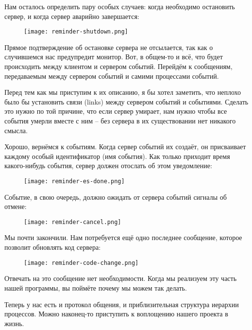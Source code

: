 Нам осталось определить пару особых случаев: когда необходимо остановить сервер, и когда сервер аварийно завершается:
\begin{figure}[h!]
    \centering
    \texttt{[image: reminder-shutdown.png]}
\end{figure}

Прямое подтверждение об остановке  сервера не отсылается, так как о случившемся нас предупредит монитор.
Вот, в общем\--то и всё, что будет происходить между клиентом и сервером событий.
Перейдём к сообщениям, передаваемым между сервером событий и самими процессами событий.

Перед тем как мы приступим к их описанию, я бы хотел заметить, что неплохо было бы установить связи (links)  между сервером событий и событиями.
Сделать это нужно по той причине, что если сервер умирает, нам нужно чтобы все события умерли вместе с ним \--- без сервера в их существовании нет никакого смысла.

Хорошо, вернёмся к событиям.
Когда сервер событий их создаёт, он присваивает каждому особый идентификатор (имя события).
Как только приходит время какого\--нибудь события, сервер должен отослать об этом уведомление:
\begin{figure}[h!]
    \centering
    \texttt{[image: reminder-es-done.png]}
\end{figure}

\clearpage
Событие, в свою очередь, должно ожидать от сервера событий сигналы об отмене:
\begin{figure}[h!]
    \centering
    \texttt{[image: reminder-cancel.png]}
\end{figure}

Мы почти закончили.
Нам потребуется ещё одно последнее сообщение, которое позволит обновлять код сервера:
\begin{figure}[h!]
    \centering
    \texttt{[image: reminder-code-change.png]}
\end{figure}

Отвечать на это сообщение нет необходимости.
Когда мы реализуем эту часть нашей программы, вы поймёте почему мы можем так делать.

Теперь у нас есть и протокол общения, и приблизительная структура иерархии процессов.
Можно наконец\--то приступить к воплощению нашего проекта в жизнь.
